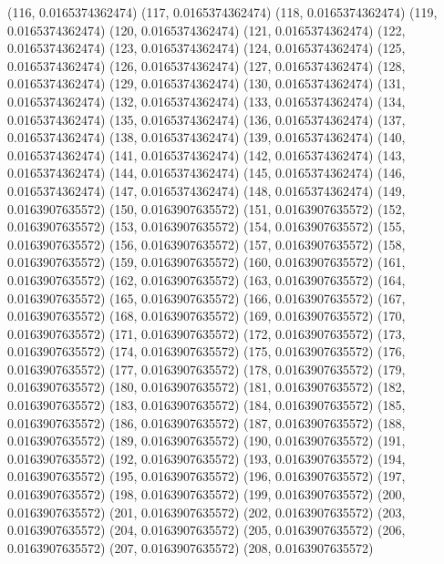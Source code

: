 {					(116, 0.0165374362474)
					(117, 0.0165374362474)
					(118, 0.0165374362474)
					(119, 0.0165374362474)
					(120, 0.0165374362474)
					(121, 0.0165374362474)
					(122, 0.0165374362474)
					(123, 0.0165374362474)
					(124, 0.0165374362474)
					(125, 0.0165374362474)
					(126, 0.0165374362474)
					(127, 0.0165374362474)
					(128, 0.0165374362474)
					(129, 0.0165374362474)
					(130, 0.0165374362474)
					(131, 0.0165374362474)
					(132, 0.0165374362474)
					(133, 0.0165374362474)
					(134, 0.0165374362474)
					(135, 0.0165374362474)
					(136, 0.0165374362474)
					(137, 0.0165374362474)
					(138, 0.0165374362474)
					(139, 0.0165374362474)
					(140, 0.0165374362474)
					(141, 0.0165374362474)
					(142, 0.0165374362474)
					(143, 0.0165374362474)
					(144, 0.0165374362474)
					(145, 0.0165374362474)
					(146, 0.0165374362474)
					(147, 0.0165374362474)
					(148, 0.0165374362474)
					(149, 0.0163907635572)
					(150, 0.0163907635572)
					(151, 0.0163907635572)
					(152, 0.0163907635572)
					(153, 0.0163907635572)
					(154, 0.0163907635572)
					(155, 0.0163907635572)
					(156, 0.0163907635572)
					(157, 0.0163907635572)
					(158, 0.0163907635572)
					(159, 0.0163907635572)
					(160, 0.0163907635572)
					(161, 0.0163907635572)
					(162, 0.0163907635572)
					(163, 0.0163907635572)
					(164, 0.0163907635572)
					(165, 0.0163907635572)
					(166, 0.0163907635572)
					(167, 0.0163907635572)
					(168, 0.0163907635572)
					(169, 0.0163907635572)
					(170, 0.0163907635572)
					(171, 0.0163907635572)
					(172, 0.0163907635572)
					(173, 0.0163907635572)
					(174, 0.0163907635572)
					(175, 0.0163907635572)
					(176, 0.0163907635572)
					(177, 0.0163907635572)
					(178, 0.0163907635572)
					(179, 0.0163907635572)
					(180, 0.0163907635572)
					(181, 0.0163907635572)
					(182, 0.0163907635572)
					(183, 0.0163907635572)
					(184, 0.0163907635572)
					(185, 0.0163907635572)
					(186, 0.0163907635572)
					(187, 0.0163907635572)
					(188, 0.0163907635572)
					(189, 0.0163907635572)
					(190, 0.0163907635572)
					(191, 0.0163907635572)
					(192, 0.0163907635572)
					(193, 0.0163907635572)
					(194, 0.0163907635572)
					(195, 0.0163907635572)
					(196, 0.0163907635572)
					(197, 0.0163907635572)
					(198, 0.0163907635572)
					(199, 0.0163907635572)
					(200, 0.0163907635572)
					(201, 0.0163907635572)
					(202, 0.0163907635572)
					(203, 0.0163907635572)
					(204, 0.0163907635572)
					(205, 0.0163907635572)
					(206, 0.0163907635572)
					(207, 0.0163907635572)
					(208, 0.0163907635572)
}
